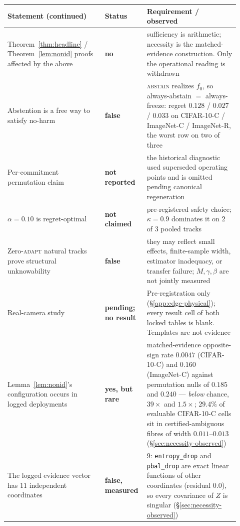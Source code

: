 \begin{center}
\scriptsize
\renewcommand{\arraystretch}{1.12}
\setlength{\tabcolsep}{4pt}
\begin{tabular}{@{}p{0.40\linewidth}p{0.14\linewidth}p{0.38\linewidth}@{}}
\toprule
Statement (continued) & Status & Requirement / observed \\
\midrule
Theorem~\ref{thm:headline} / Theorem~\ref{lem:nonid} proofs affected by the above & \textbf{no} & sufficiency is arithmetic; necessity is the matched-evidence construction. Only the operational reading is withdrawn \\
Abstention is a free way to satisfy no-harm & \textbf{false} & \textsc{abstain} realizes $f_0$, so always-abstain $=$ always-freeze: regret $0.128$ / $0.027$ / $0.033$ on CIFAR-10-C / ImageNet-C / ImageNet-R, the worst row on two of three \\
Per-commitment permutation claim & \textbf{not reported} & the historical diagnostic used superseded operating points and is omitted pending canonical regeneration \\
$\alpha{=}0.10$ is regret-optimal & \textbf{not claimed} & pre-registered safety choice; $\kappa{=}0.9$ dominates it on $2$ of $3$ pooled tracks \\
Zero-\textsc{adapt} natural tracks prove structural unknowability & \textbf{false} & they may reflect small effects, finite-sample width, estimator inadequacy, or transfer failure; $M,\gamma,\beta$ are not jointly measured \\
Real-camera study & \textbf{pending; no result} & Pre-registration only (\S\ref{app:edge-physical}); every result cell of both locked tables is blank. Templates are not evidence \\
Lemma~\ref{lem:nonid}'s configuration occurs in logged deployments & \textbf{yes, but rare} & matched-evidence opposite-sign rate $0.0047$ (CIFAR-10-C) and $0.160$ (ImageNet-C) against permutation nulls of $0.185$ and $0.240$ --- \emph{below} chance, $39\times$ and $1.5\times$; $29.4\%$ of evaluable CIFAR-10-C cells sit in certified-ambiguous fibres of width $0.011$--$0.013$ (\S\ref{sec:necessity-observed}) \\
The logged evidence vector has $11$ independent coordinates & \textbf{false, measured} & $9$: \texttt{entropy\_drop} and \texttt{pbal\_drop} are exact linear functions of other coordinates (residual $0.0$), so every covariance of $Z$ is singular (\S\ref{sec:necessity-observed}) \\
\bottomrule
\end{tabular}
\end{center}

